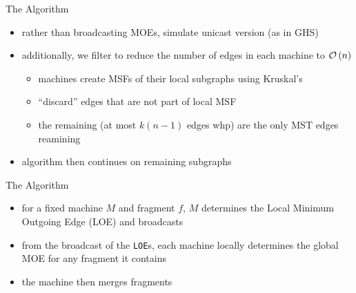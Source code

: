 \begin{frame}{The Algorithm}
    \begin{itemize}
        \item rather than broadcasting MOEs, simulate unicast version (as in GHS)
        \item additionally, we filter to reduce the number of edges in each machine to $\mathcal{O}\left(n\right)$
              \begin{itemize}
                  \item machines create MSFs of their local subgraphs using Kruskal's
                  \item ``discard'' edges that are not part of local MSF
                  \item the remaining (at most $k(n-1)$ edges whp) are the only MST edges reamining
              \end{itemize}
        \item algorithm then continues on remaining subgraphs
    \end{itemize}
\end{frame}

\begin{frame}{The Algorithm}
    \begin{itemize}
        \item for a fixed machine $M$ and fragment $f$, $M$ determines the
              \alert{Local Minimum Outgoing Edge} (LOE) and broadcasts
        \item from the broadcast of the \texttt{LOE}s, each machine locally determines the global MOE for any fragment it contains
        \item the machine then merges fragments
    \end{itemize}
\end{frame}


